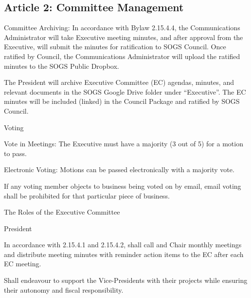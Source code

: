 \subsection{Article 2: Committee Management}
\begin{longenum}[ label*=\thesubsection.\arabic*., align=left] 
\item Committee Archiving: In accordance with Bylaw 2.15.4.4, the Communications Administrator will take Executive meeting minutes, and after approval from the
Executive, will submit the minutes for ratification to SOGS Council. Once ratified by Council, the Communications Administrator will upload the ratified minutes to the SOGS
Public Dropbox.
	\begin{longenum}[ label*=\arabic*., align=left]
	\item The President will archive Executive Committee (EC) agendas, minutes, and relevant documents in the SOGS Google Drive folder under “Executive”. The EC minutes will be included (linked) in the Council Package and ratified by SOGS Council.
	\end{longenum}
\item Voting
	\begin{longenum}[ label*=\arabic*., align=left]
	\item Vote in Meetings: The Executive must have a majority (3 out of 5) for a motion to pass.
	\item Electronic Voting: Motions can be passed electronically with a majority vote.
		\begin{longenum}[ label*=\arabic*., align=left]
		\item If any voting member objects to business being voted on by email, email voting shall be prohibited for that particular piece of business.
		\end{longenum}
	 \end{longenum}
\item The Roles of the Executive Committee
	\begin{longenum}[ label*=\arabic*., align=left]
	\item President
		\begin{longenum}[ label*=\arabic*., align=left]
		\item In accordance with 2.15.4.1 and 2.15.4.2, shall call and Chair monthly meetings and distribute meeting minutes with reminder action items to the EC after each EC meeting.
		\item Shall endeavour to support the Vice-Presidents with their projects while ensuring their autonomy and fiscal responsibility.

\end{longenum}
\end{longenum}
\end{longenum}

